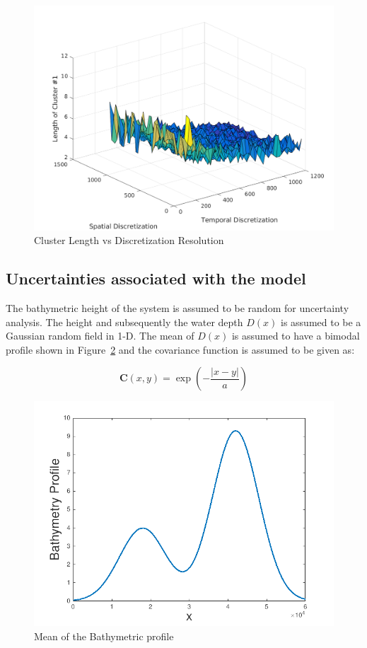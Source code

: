\begin{figure}[H]
\centering
\includegraphics[width=\textwidth]{figures_2/clust_length}
\caption{Cluster Length vs Discretization Resolution}
\label{clustlength_plot}
\end{figure}


\subsection{Uncertainties associated with the model}

The bathymetric height of the system is assumed to be random for uncertainty analysis. The height and subsequently the water depth $D(x)$ is assumed to be a Gaussian random field in 1-D. The mean of $D(x)$ is assumed to have a bimodal profile shown in Figure~\ref{bathymetry} and the covariance function is assumed to be given as:

\begin{equation}
\textbf{C}(x,y) = \exp \left(-\frac{|x-y|}{a} \right)
\end{equation}

\begin{figure}[H]
\centering
\includegraphics[scale=0.6]{figures_2/bathymetry}
\caption{Mean of the Bathymetric profile}
\label{bathymetry}
\end{figure}

